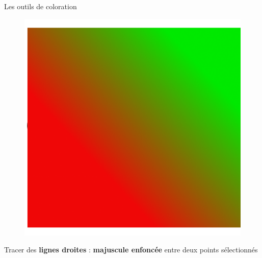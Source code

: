 \documentclass[10pt,svgnames,usenames,table]{beamer}
\begin{document}
\begin{frame}[allowframebreaks]{Les outils de coloration}
\begin{itemize}
\begin{minipage}{0.45\textwidth}
\begin{figure}
	    	\includegraphics[width=\textwidth]{Images/degrade_ex2.png} 
	\end{figure}
	\end{minipage}


	Tracer des \textbf{lignes droites} : \textbf{majuscule enfoncée} entre deux points sélectionnés
	\end{itemize}
\end{frame}


\end{document}
